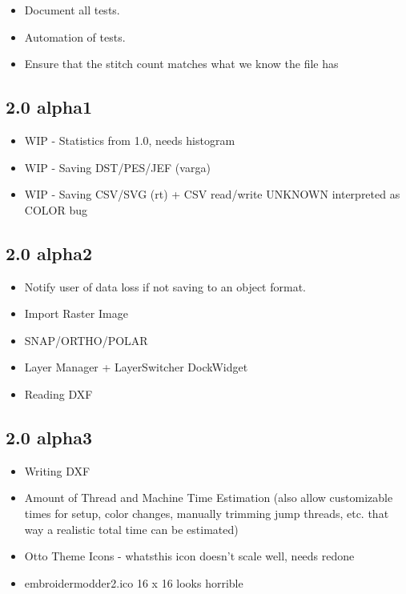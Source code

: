 \documentclass[a4paper]{report}
\begin{document}
\begin{itemize}
\item Document all tests.
\item Automation of tests.
\item Ensure that the stitch count matches what we know the file has
\end{itemize}

\subsection{2.0 alpha1}

\begin{itemize}
\item WIP - Statistics from 1.0, needs histogram
\item WIP - Saving DST/PES/JEF (varga)
\item WIP - Saving CSV/SVG (rt) + CSV read/write UNKNOWN interpreted as COLOR bug
\end{itemize}

\subsection{2.0 alpha2}

\begin{itemize}
\item Notify user of data loss if not saving to an object format.
\item Import Raster Image
\item SNAP/ORTHO/POLAR
\item Layer Manager + LayerSwitcher DockWidget
\item Reading DXF
\end{itemize}

\subsection{2.0 alpha3}

\begin{itemize}
\item Writing DXF
\item Amount of Thread and Machine Time Estimation (also allow customizable times for setup, color changes, manually trimming jump threads, etc. that way a realistic total time can be estimated)
\item Otto Theme Icons - whatsthis icon doesn't scale well, needs redone
\item embroidermodder2.ico 16 x 16 looks horrible
\end{itemize}
\end{document}
